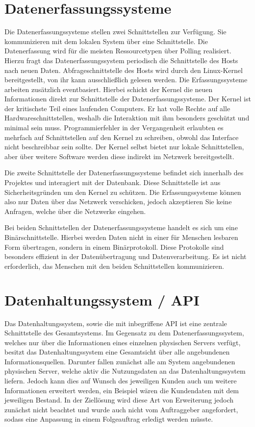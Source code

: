 \section{Datenerfassungssysteme}
Die Datenerfassungssysteme stellen zwei Schnittstellen zur Verfügung. Sie
kommunizieren mit dem lokalen System über eine
 Schnittstelle. Die Datenerfassung wird
für die meisten Ressourcetypen über Polling realisiert. Hierzu fragt das
Datenerfassungssystem periodisch die Schnittstelle des Hosts nach neuen Daten.
Abfrageschnittstelle des Hosts wird durch den Linux-Kernel bereitgestellt, von
ihr kann ausschließlich gelesen werden. Die Erfassungssysteme arbeiten
zusätzlich eventbasiert. Hierbei schickt der Kernel die neuen Informationen
direkt zur Schnittstelle der Datenerfassungssysteme. Der Kernel ist der
kritischste Teil eines laufenden Computers. Er hat volle Rechte auf alle
Hardwareschnittstellen, weshalb die Interaktion mit ihm besonders geschützt und
minimal sein muss. Programmierfehler in der Vergangenheit erlaubten es mehrfach
auf Schnittstellen auf den Kernel zu schreiben, obwohl das Interface nicht
beschreibbar sein sollte. Der Kernel selbst bietet nur lokale Schnittstellen,
aber über weitere Software werden diese indirekt im Netzwerk bereitgestellt.

Die zweite Schnittstelle der Datenerfassungssysteme befindet sich innerhalb des
Projektes und interagiert mit der Datenbank. Diese Schnittstelle ist aus
Sicherheitsgründen  um den Kernel zu
schützen. Die Erfassungssysteme können also nur Daten über das Netzwerk
verschicken, jedoch akzeptieren Sie keine Anfragen, welche über die Netzwerke
eingehen.

Bei beiden Schnittstellen der Datenerfassungssysteme handelt es sich um eine
Binärschnittstelle. Hierbei werden Daten nicht in einer für Menschen lesbaren
Form übertragen, sondern in einem Binärprotokoll. Diese Protokolle sind
besonders effizient in der Datenübertragung und Datenverarbeitung. Es ist nicht
erforderlich, das Menschen mit den beiden Schnittstellen kommunizieren.
\tm%

\section{Datenhaltungssystem / API}
Das Datenhaltungssystem, sowie die mit inbegriffene API ist eine zentrale
Schnittstelle des Gesamtsystems. Im Gegensatz zu dem Datenerfassungssystem,
welches nur über die Informationen eines einzelnen physischen Servers verfügt,
besitzt das Datenhaltungssystem eine Gesamtsicht über alle angebundenen
Informationsquellen. Darunter fallen zunächst alle am System angebundenen
physischen Server, welche aktiv die Nutzungsdaten an das Datenhaltungssystem
liefern. Jedoch kann dies auf Wunsch des jeweiligen Kunden auch um weitere
Informationen erweitert werden, ein Beispiel wären die Kundendaten mit dem
jeweiligen Bestand. In der Ziellösung wird diese Art von Erweiterung jedoch
zunächst nicht beachtet und wurde auch nicht vom Auftraggeber angefordert,
sodass eine Anpassung in einem Folgeauftrag erledigt werden müsste.

